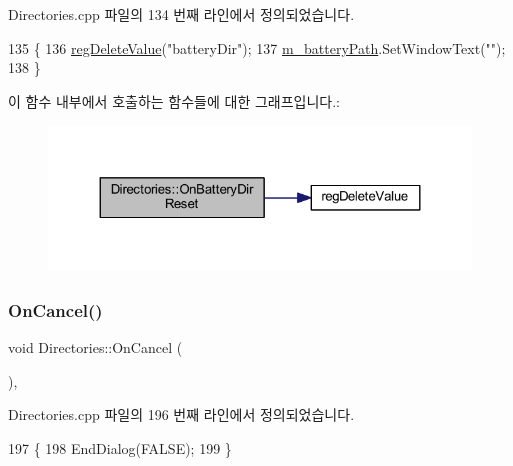 Directories.\+cpp 파일의 134 번째 라인에서 정의되었습니다.


\begin{DoxyCode}
135 \{
136   \mbox{\hyperlink{_reg_8cpp_aa7b7490d17e18a60838a58482114fd75}{regDeleteValue}}(\textcolor{stringliteral}{"batteryDir"});
137   \mbox{\hyperlink{class_directories_af8f18fc9d1fbcd0df0cba4ec6fb862de}{m\_batteryPath}}.SetWindowText(\textcolor{stringliteral}{""});
138 \}
\end{DoxyCode}
이 함수 내부에서 호출하는 함수들에 대한 그래프입니다.\+:
\nopagebreak
\begin{figure}[H]
\begin{center}
\leavevmode
\includegraphics[width=324pt]{class_directories_a9479f79772b934344110acfccd64a064_cgraph}
\end{center}
\end{figure}
\mbox{\label{class_directories_a139df4e3666356c21c7e5f02ae268193}} 
\subsubsection{\texorpdfstring{On\+Cancel()}{OnCancel()}}
{\footnotesize\ttfamily void Directories\+::\+On\+Cancel (\begin{DoxyParamCaption}{ }\end{DoxyParamCaption})\hspace{0.3cm}{\ttfamily [protected]}, {\ttfamily [virtual]}}



Directories.\+cpp 파일의 196 번째 라인에서 정의되었습니다.


\begin{DoxyCode}
197 \{
198   EndDialog(FALSE);
199 \}
\end{DoxyCode}
\mbox{\label{class_directories_a01d34b2ff1d1c0a2a3e638e0cfdd7db7}} 
